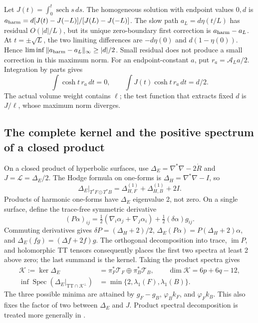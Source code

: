 \documentclass[a4paper,11pt]{article}
\numberwithin{equation}{section}
\theoremstyle{definition}
\newcommand{\spec}{\operatorname{Spec}}
\begin{document}
Let $J(t)=\int_0^t\operatorname{sech}s\,ds$.
The homogeneous solution with endpoint values $0,d$ is
$a_{\rm harm}=d[J(t)-J(-L)]/[J(L)-J(-L)]$.
The slow path $a_L=d\eta(t/L)$ has residual $O(|d|/L)$, but its unique
zero-boundary first correction is $a_{\rm harm}-a_L$.
At $t=\pm\sqrt L$, the two limiting differences are
$-d\eta(0)$ and $d(1-\eta(0))$. Hence
$\liminf\|a_{\rm harm}-a_L\|_\infty\ge|d|/2$.
Small residual does not produce a small correction in this maximum norm.
For an endpoint-constant $a$, put $r_a=\mathcal A_La/2$.
Integration by parts gives
\[
\int\cosh t\,r_a\,dt=0,\qquad
\int J(t)\cosh t\,r_a\,dt=d/2.
\]
The actual volume weight contains $\ell$; the test function that extracts
fixed $d$ is $J/\ell$, whose maximum norm diverges.

\subsection{The complete kernel and the positive spectrum of a closed product}
On a closed product of hyperbolic surfaces, use
$\Delta_E=\nabla^*\nabla-2\mathring R$ and
$J=\mathcal L=\Delta_E/2$.
The Hodge formula on one-forms is $\Delta_H=\nabla^*\nabla-I$, so
\[
\Delta_E|_{T^*F\odot T^*B}
=\Delta_{H,F}^{(1)}+\Delta_{H,B}^{(1)}+2I.
\]
Products of harmonic one-forms have $\Delta_E$ eigenvalue 2, not zero.
On a single surface, define the trace-free symmetric derivative
\[
(P\alpha)_{ij}
=\tfrac12(\nabla_i\alpha_j+\nabla_j\alpha_i)
+\tfrac12(\delta\alpha)g_{ij}.
\]
Commuting derivatives gives
$\delta P=(\Delta_H+2)/2$,
$\Delta_E(P\alpha)=P(\Delta_H+2)\alpha$, and
$\Delta_E(fg)=(\Delta f+2f)g$.
The orthogonal decomposition into trace, $\operatorname{im}P$, and
holomorphic TT tensors consequently places the first two spectra at least 2
above zero; the last summand is the kernel.
Taking the product spectra gives
\begin{equation}\label{eq:ED-product-gap}
\begin{aligned}
\mathcal K:=\ker\Delta_E
&=\pi_F^*\mathcal T_F\oplus\pi_B^*\mathcal T_B,\qquad
\dim\mathcal K=6p+6q-12,\\
\inf\spec(\Delta_E|_{\mathrm{TT}\cap\mathcal K^\perp})
&=\min\{2,\lambda_1(F),\lambda_1(B)\}.
\end{aligned}
\end{equation}
The three possible minima are attained by $g_F-g_B$,
$\varphi_Bk_F$, and $\varphi_Fk_B$.
This also fixes the factor of two between $\Delta_E$ and $J$.
Product spectral decomposition is treated more generally in
\cite[Proposition 4.1]{Kroncke}.
\end{document}
